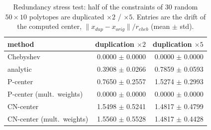 \begin{table}[t]\centering
\caption{Redundancy stress test: half of the constraints of 30 random $50\times10$ polytopes are duplicated $\times2$ / $\times5$. Entries are the drift of the computed center, $\|x_{dup}-x_{orig}\|/r_{cheb}$ (mean $\pm$ std).}
\label{tab:redundancy}
\small
\begin{tabular}{lrr}
\toprule
method & duplication $\times2$ & duplication $\times5$ \\
\midrule
Chebyshev & 0.0000 $\pm$ 0.0000 & 0.0000 $\pm$ 0.0000 \\
analytic & 0.3908 $\pm$ 0.0266 & 0.7859 $\pm$ 0.0593 \\
P-center & 0.7650 $\pm$ 0.2557 & 1.5274 $\pm$ 0.2993 \\
P-center (mult.\ weights) & 0.0000 $\pm$ 0.0000 & 0.0000 $\pm$ 0.0000 \\
CN-center & 1.5498 $\pm$ 0.5241 & 1.4817 $\pm$ 0.4799 \\
CN-center (mult.\ weights) & 1.5560 $\pm$ 0.5528 & 1.4817 $\pm$ 0.4428 \\
\bottomrule
\end{tabular}
\end{table}
